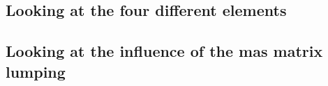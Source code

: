 

\subsection*{Looking at the four different elements}






\subsection*{Looking at the influence of the mas matrix lumping}

